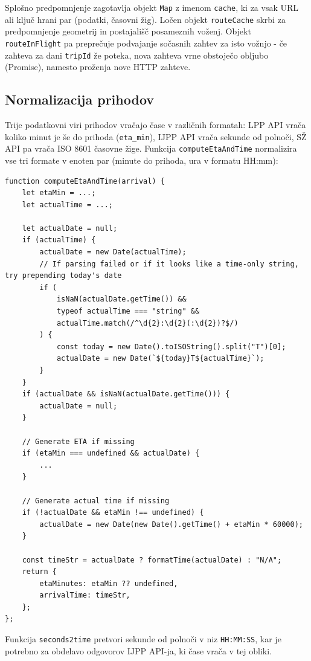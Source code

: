 \documentclass[12pt]{article}
\begin{document}
Splošno predpomnjenje zagotavlja objekt \texttt{Map} z imenom \texttt{cache}, ki za vsak URL ali ključ hrani par (podatki, časovni žig). Ločen objekt \texttt{routeCache} skrbi za predpomnjenje geometrij in postajališč posameznih voženj. Objekt \texttt{routeInFlight} pa preprečuje podvajanje sočasnih zahtev za isto vožnjo - če zahteva za dani \texttt{tripId} že poteka, nova zahteva vrne obstoječo obljubo (Promise), namesto proženja nove HTTP zahteve.

\subsection{Normalizacija prihodov}

Trije podatkovni viri prihodov vračajo čase v različnih formatah: LPP API vrača koliko minut je še do prihoda (\texttt{eta\_min}), IJPP API vrača sekunde od polnoči, SŽ API pa vrača ISO 8601 časovne žige. Funkcija \texttt{computeEtaAndTime} normalizira vse tri formate v enoten par (minute do prihoda, ura v formatu HH:mm):

\begin{lstlisting}[caption={Normalizacija ETA iz različnih formatov}, label={lst:eta}]
function computeEtaAndTime(arrival) {
	let etaMin = ...;
	let actualTime = ...; 

	let actualDate = null;
	if (actualTime) {
		actualDate = new Date(actualTime);
		// If parsing failed or if it looks like a time-only string, try prepending today's date
		if (
			isNaN(actualDate.getTime()) &&
			typeof actualTime === "string" &&
			actualTime.match(/^\d{2}:\d{2}(:\d{2})?$/)
		) {
			const today = new Date().toISOString().split("T")[0];
			actualDate = new Date(`${today}T${actualTime}`);
		}
	}
	if (actualDate && isNaN(actualDate.getTime())) {
		actualDate = null;
	}

	// Generate ETA if missing
	if (etaMin === undefined && actualDate) {
		...
	}

	// Generate actual time if missing
	if (!actualDate && etaMin !== undefined) {
		actualDate = new Date(new Date().getTime() + etaMin * 60000);
	}

	const timeStr = actualDate ? formatTime(actualDate) : "N/A";
	return {
		etaMinutes: etaMin ?? undefined,
		arrivalTime: timeStr,
	};
};

\end{lstlisting}

Funkcija \texttt{seconds2time} pretvori sekunde od polnoči v niz \texttt{HH:MM:SS}, kar je potrebno za obdelavo odgovorov IJPP API-ja, ki čase vrača v tej obliki.
\end{document}
